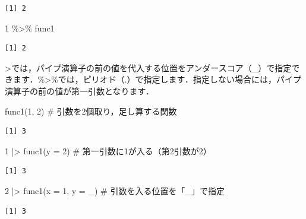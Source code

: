 \documentclass[
  letterpaper,
  DIV=11,
  numbers=noendperiod]{scrreprt}
\newenvironment{Shaded}{\begin{snugshade}}{\end{snugshade}}
\newcommand{\AttributeTok}[1]{\textcolor[rgb]{0.40,0.45,0.13}{#1}}
\newcommand{\CommentTok}[1]{\textcolor[rgb]{0.37,0.37,0.37}{#1}}
\newcommand{\DecValTok}[1]{\textcolor[rgb]{0.68,0.00,0.00}{#1}}
\newcommand{\FunctionTok}[1]{\textcolor[rgb]{0.28,0.35,0.67}{#1}}
\newcommand{\NormalTok}[1]{\textcolor[rgb]{0.00,0.23,0.31}{#1}}
\newcommand{\SpecialCharTok}[1]{\textcolor[rgb]{0.37,0.37,0.37}{#1}}
\begin{document}
\begin{verbatim}
[1] 2
\end{verbatim}

\begin{Shaded}
\begin{Highlighting}[]
\DecValTok{1} \SpecialCharTok{\%\textgreater{}\%}\NormalTok{ func1}
\end{Highlighting}
\end{Shaded}

\begin{verbatim}
[1] 2
\end{verbatim}

\textbar\textgreater では，パイプ演算子の前の値を代入する位置をアンダースコア（\_）で指定できます．\%\textgreater\%では，ピリオド（.）で指定します．指定しない場合には，パイプ演算子の前の値が第一引数となります．

\begin{Shaded}
\begin{Highlighting}[]
\FunctionTok{func1}\NormalTok{(}\DecValTok{1}\NormalTok{, }\DecValTok{2}\NormalTok{) }\CommentTok{\# 引数を2個取り，足し算する関数}
\end{Highlighting}
\end{Shaded}

\begin{verbatim}
[1] 3
\end{verbatim}

\begin{Shaded}
\begin{Highlighting}[]
\DecValTok{1} \SpecialCharTok{|\textgreater{}} \FunctionTok{func1}\NormalTok{(}\AttributeTok{y =} \DecValTok{2}\NormalTok{) }\CommentTok{\# 第一引数に1が入る（第2引数が2）}
\end{Highlighting}
\end{Shaded}

\begin{verbatim}
[1] 3
\end{verbatim}

\begin{Shaded}
\begin{Highlighting}[]
\DecValTok{2} \SpecialCharTok{|\textgreater{}} \FunctionTok{func1}\NormalTok{(}\AttributeTok{x =} \DecValTok{1}\NormalTok{, }\AttributeTok{y =}\NormalTok{ \_) }\CommentTok{\# 引数を入る位置を「\_」で指定}
\end{Highlighting}
\end{Shaded}

\begin{verbatim}
[1] 3
\end{verbatim}
\end{document}
